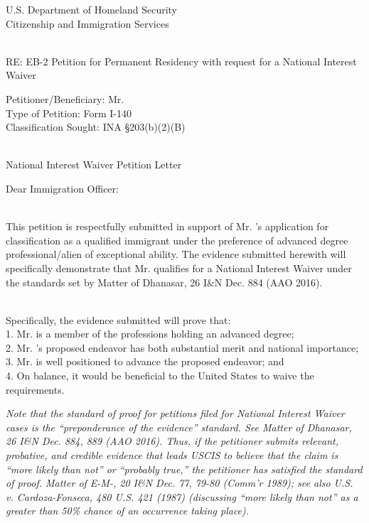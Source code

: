 U.S. Department of Homeland Security\\
Citizenship and Immigration Services\\
\strut \\
RE: EB-2 Petition for Permanent Residency with request for a National Interest Waiver

\begin{center}
Petitioner/Beneficiary: \quad Mr. \myname \\
Type of Petition: \quad Form I-140\\
Classification Sought: \quad INA §203(b)(2)(B)\\
\strut \\
National Interest Waiver Petition Letter
\end{center}

Dear Immigration Officer:\\
\strut \\
This petition is respectfully submitted in support of Mr. \myname's application for classification as a qualified immigrant under the preference of advanced degree professional/alien of exceptional ability. The evidence submitted herewith will specifically demonstrate that Mr. \myname qualifies for a National Interest Waiver under the standards set by Matter of Dhanasar, 26 I\&N Dec. 884 (AAO 2016).\\
\strut \\
Specifically, the evidence submitted will prove that:\\
1. Mr. \myname is a member of the professions holding an advanced degree;\\
2. Mr. \myname's proposed endeavor has both substantial merit and national importance;\\
3. Mr. \myname is well positioned to advance the proposed endeavor; and\\
4. On balance, it would be beneficial to the United States to waive the
requirements.

\emph{Note that the standard of proof for petitions filed for National
Interest Waiver cases is the ``preponderance of the evidence'' standard.
See Matter of Dhanasar, 26 I\&N Dec. 884, 889 (AAO 2016). Thus, if the
petitioner submits relevant, probative, and credible evidence that leads
USCIS to believe that the claim is ``more likely than not'' or
``probably true,'' the petitioner has satisfied the standard of proof.
Matter of E-M-, 20 I\&N Dec. 77, 79-80 (Comm'r 1989); see also U.S. v.
Cardoza-Fonseca, 480 U.S. 421 (1987) (discussing ``more likely than
not'' as a greater than 50\% chance of an occurrence taking place).}

